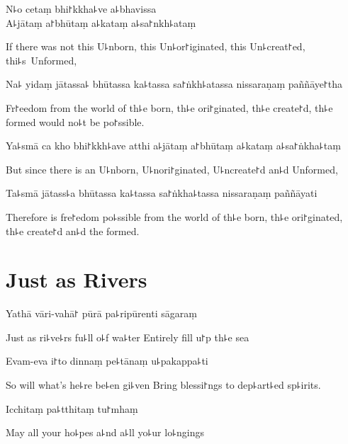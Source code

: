 N꜕o cetaṃ bhi꜓kkha꜕ve a꜕bhavissa\\
A꜕jātaṃ a꜓bhūtaṃ a꜕kataṃ a꜕sa꜓nkh꜕ataṃ

\begin{english}
  If there was not this U꜕nborn, this Un꜕or꜓iginated, this Un꜕creat꜓ed, thi꜕s~Unformed,
\end{english}

Na꜕ yidaṃ jātassa꜕ bhūtassa ka꜕tassa sa꜓ṅkh꜕atassa nissaraṇaṃ paññāye꜓tha

\begin{english}
  Fr꜓eedom from the world of th꜕e born, th꜕e ori꜓ginated, th꜕e create꜓d, th꜕e formed would no꜕t be po꜓ssible.
\end{english}

Ya꜕smā ca kho bhi꜓kkh꜕ave atthi a꜕jātaṃ a꜓bhūtaṃ a꜕kataṃ a꜕sa꜓ṅkha꜕taṃ

\begin{english}
  But since there is an U꜕nborn, U꜕nori꜓ginated, U꜕ncreate꜓d an꜕d Unformed,
\end{english}

Ta꜕smā jātass꜕a bhūtassa ka꜕tassa sa꜓ṅkha꜕tassa nissaraṇaṃ paññāyati

\begin{english}
  Therefore is fre꜓edom po꜕ssible from the world of th꜕e born, th꜕e ori꜓ginated, th꜕e create꜓d an꜕d the formed.
\end{english}


\chapter{Just as Rivers}%


Yathā vāri-vahā꜓ pūrā pa꜕ripūrenti sāgaraṃ

\begin{english}
  Just as ri꜕ve꜕rs fu꜕ll o꜕f wa꜕ter Entirely fill u꜓p th꜕e sea
\end{english}

Evam-eva i꜓to dinnaṃ pe꜕tānaṃ u꜕pakappa꜕ti

\begin{english}
  So will what's he꜕re be꜕en gi꜕ven Bring blessi꜓ngs to dep꜕art꜕ed sp꜕irits.
\end{english}

Icchitaṃ pa꜕tthitaṃ tu꜓mhaṃ

\begin{english}
  May all your ho꜕pes a꜕nd a꜕ll yo꜕ur lo꜕ngings
\end{english}

